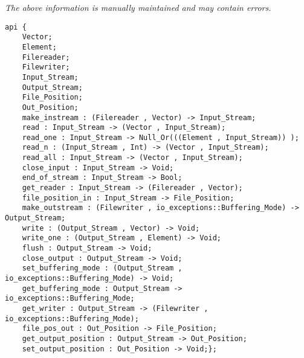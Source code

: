 \label{api:Winix\_Pure\_File\_For\_Os\_\_Premicrothread}

{\tiny \it The above information is manually maintained and may contain errors.}
\begin{verbatim}
api {
    Vector;
    Element;
    Filereader;
    Filewriter;
    Input_Stream;
    Output_Stream;
    File_Position;
    Out_Position;
    make_instream : (Filereader , Vector) -> Input_Stream;
    read : Input_Stream -> (Vector , Input_Stream);
    read_one : Input_Stream -> Null_Or(((Element , Input_Stream)) );
    read_n : (Input_Stream , Int) -> (Vector , Input_Stream);
    read_all : Input_Stream -> (Vector , Input_Stream);
    close_input : Input_Stream -> Void;
    end_of_stream : Input_Stream -> Bool;
    get_reader : Input_Stream -> (Filereader , Vector);
    file_position_in : Input_Stream -> File_Position;
    make_outstream : (Filewriter , io_exceptions::Buffering_Mode) -> Output_Stream;
    write : (Output_Stream , Vector) -> Void;
    write_one : (Output_Stream , Element) -> Void;
    flush : Output_Stream -> Void;
    close_output : Output_Stream -> Void;
    set_buffering_mode : (Output_Stream , io_exceptions::Buffering_Mode) -> Void;
    get_buffering_mode : Output_Stream -> io_exceptions::Buffering_Mode;
    get_writer : Output_Stream -> (Filewriter , io_exceptions::Buffering_Mode);
    file_pos_out : Out_Position -> File_Position;
    get_output_position : Output_Stream -> Out_Position;
    set_output_position : Out_Position -> Void;};
\end{verbatim}
